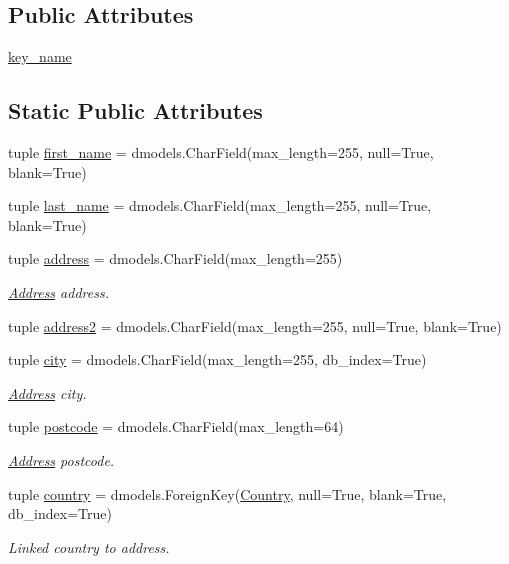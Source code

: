\subsection*{Public Attributes}
\begin{DoxyCompactItemize}
\item 
\hyperlink{classcore_1_1models_1_1Address_a5ebbca47356580cd05088f58d24d025c}{key\-\_\-name}
\end{DoxyCompactItemize}
\subsection*{Static Public Attributes}
\begin{DoxyCompactItemize}
\item 
tuple \hyperlink{classcore_1_1models_1_1Address_a7d9c715a5bfb018bfc9ca178d91b6b8f}{first\-\_\-name} = dmodels.\-Char\-Field(max\-\_\-length=255, null=True, blank=True)
\item 
tuple \hyperlink{classcore_1_1models_1_1Address_abafe62dc9d25c167398a989a22caee51}{last\-\_\-name} = dmodels.\-Char\-Field(max\-\_\-length=255, null=True, blank=True)
\item 
tuple \hyperlink{classcore_1_1models_1_1Address_a972fdb0ba26470757d213bdb6f140402}{address} = dmodels.\-Char\-Field(max\-\_\-length=255)
\begin{DoxyCompactList}\small\item\em \hyperlink{classcore_1_1models_1_1Address}{Address} address. \end{DoxyCompactList}\item 
tuple \hyperlink{classcore_1_1models_1_1Address_af65d2b194530748ef11ea7f79606cc0d}{address2} = dmodels.\-Char\-Field(max\-\_\-length=255, null=True, blank=True)
\item 
tuple \hyperlink{classcore_1_1models_1_1Address_ac5519e5d6f43f88d8d7c24f4d3439928}{city} = dmodels.\-Char\-Field(max\-\_\-length=255, db\-\_\-index=True)
\begin{DoxyCompactList}\small\item\em \hyperlink{classcore_1_1models_1_1Address}{Address} city. \end{DoxyCompactList}\item 
tuple \hyperlink{classcore_1_1models_1_1Address_affbd91eecd5cf5488103ea1efc16100d}{postcode} = dmodels.\-Char\-Field(max\-\_\-length=64)
\begin{DoxyCompactList}\small\item\em \hyperlink{classcore_1_1models_1_1Address}{Address} postcode. \end{DoxyCompactList}\item 
tuple \hyperlink{classcore_1_1models_1_1Address_a46997a17a6397d68ffb8e0c9e5244c1f}{country} = dmodels.\-Foreign\-Key(\hyperlink{classcore_1_1models_1_1Country}{Country}, null=True, blank=True, db\-\_\-index=True)
\begin{DoxyCompactList}\small\item\em Linked country to address. \end{DoxyCompactList}\end{DoxyCompactItemize}


